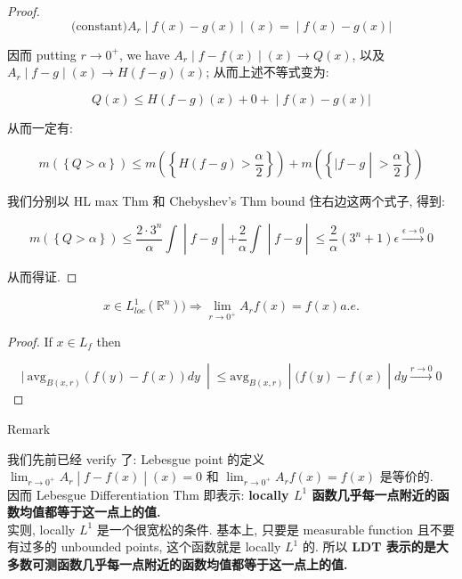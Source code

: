 \documentclass{qlnotes-export}
\begin{document}
\begin{proof}
\[\left. \text{(constant)} A_{r} \middle| f(x) - g(x) \middle| (x) = \middle| f(x) - g(x)| \right.\]

因而 putting \(r\rightarrow 0^{+}\), we have \(\left. A_{r} \middle| f - f(x) \middle| (x)\rightarrow Q(x) \right.\), 以及 \(\left. A_{r} \middle| f - g \middle| (x)\rightarrow H(f - g)(x) \right.\); 从而上述不等式变为:

\[\left. Q(x) \leq H(f - g)(x) + 0 + \middle| f(x) - g(x)| \right.\]

从而一定有:

\[m(\left\{ {Q > \alpha} \right\}) \leq m(\left\{ {H(f - g) > \frac{\alpha}{2}} \right\}) + m(\left\{ |f - g \middle| > \frac{\alpha}{2} \right\})\]

我们分别以 HL max Thm 和 Chebyshev's Thm bound 住右边这两个式子, 得到:

\[\left. m(\left\{ {Q > \alpha} \right\}) \leq \frac{2 \cdot 3^{n}}{\alpha}\int \middle| f - g \middle| + \frac{2}{\alpha}\int \middle| f - g \middle| \leq \frac{2}{\alpha}(3^{n} + 1)\epsilon\overset{\epsilon\rightarrow 0}{\rightarrow}0 \right.\]

从而得证.

\end{proof}

\begin{corollary}

\[x \in L_{loc}^{1}({\mathbb{R}}^{n}))\Longrightarrow\lim\limits_{r\rightarrow 0^{+}}A_{r}f(x) = f(x) a.e.\]

\end{corollary}

\begin{proof}

If \(x \in L_{f}\) then

\[\left. |\ \text{avg}_{B(x,r)}(f(y) - f(x)) dy\  \middle| \leq \text{avg}_{B(x,r)} \middle| (f(y) - f(x) \middle| dy\overset{r\rightarrow 0}{\rightarrow}0 \right.\]

\end{proof}

\begin{qlremark}{Remark}

我们先前已经 verify 了: Lebesgue point 的定义 \(\left. \lim_{r\rightarrow 0^{+}}A_{r} \middle| f - f(x) \middle| (x) = 0 \right.\) 和 \(\lim_{r\rightarrow 0^{+}}A_{r}f(x) = f(x)\) 是等价的.\\
因而 Lebesgue Differentiation Thm 即表示: \textbf{locally \(L^{1}\) 函数几乎每一点附近的函数均值都等于这一点上的值.}\\
实则, locally \(L^{1}\) 是一个很宽松的条件. 基本上, 只要是 measurable function 且不要有过多的 unbounded points, 这个函数就是 locally \(L^{1}\) 的. 所以 \textbf{LDT 表示的是大多数可测函数几乎每一点附近的函数均值都等于这一点上的值.}\\

\end{qlremark}
\end{document}
